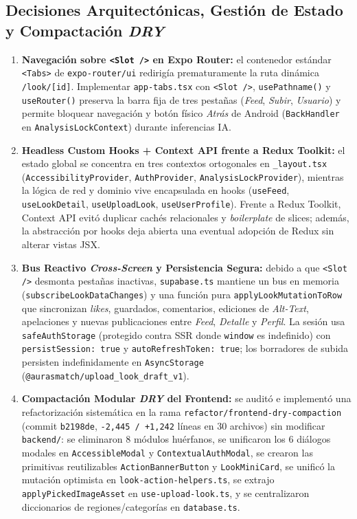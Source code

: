 \documentclass[conference]{IEEEtran}
\begin{document}
\subsection{Decisiones Arquitectónicas, Gestión de Estado y Compactación \textit{DRY}}
\begin{enumerate}
    \item \textbf{Navegación sobre \texttt{<Slot />} en Expo Router:} el contenedor estándar \texttt{<Tabs>} de \texttt{expo-router/ui} redirigía prematuramente la ruta dinámica \texttt{/look/[id]}. Implementar \texttt{app-tabs.tsx} con \texttt{<Slot />}, \texttt{usePathname()} y \texttt{useRouter()} preserva la barra fija de tres pestañas (\textit{Feed}, \textit{Subir}, \textit{Usuario}) y permite bloquear navegación y botón físico \textit{Atrás} de Android (\texttt{BackHandler} en \texttt{AnalysisLockContext}) durante inferencias IA.
    \item \textbf{Headless Custom Hooks + Context API frente a Redux Toolkit:} el estado global se concentra en tres contextos ortogonales en \texttt{\_layout.tsx} (\texttt{AccessibilityProvider}, \texttt{AuthProvider}, \texttt{AnalysisLockProvider}), mientras la lógica de red y dominio vive encapsulada en hooks (\texttt{useFeed}, \texttt{useLookDetail}, \texttt{useUploadLook}, \texttt{useUserProfile}). Frente a Redux Toolkit, Context API evitó duplicar cachés relacionales y \textit{boilerplate} de slices; además, la abstracción por hooks deja abierta una eventual adopción de Redux sin alterar vistas JSX.
    \item \textbf{Bus Reactivo \textit{Cross-Screen} y Persistencia Segura:} debido a que \texttt{<Slot />} desmonta pestañas inactivas, \texttt{supabase.ts} mantiene un bus en memoria (\texttt{subscribeLookDataChanges}) y una función pura \texttt{applyLookMutationToRow} que sincronizan \textit{likes}, guardados, comentarios, ediciones de \textit{Alt-Text}, apelaciones y nuevas publicaciones entre \textit{Feed}, \textit{Detalle} y \textit{Perfil}. La sesión usa \texttt{safeAuthStorage} (protegido contra SSR donde \texttt{window} es indefinido) con \texttt{persistSession: true} y \texttt{autoRefreshToken: true}; los borradores de subida persisten indefinidamente en \texttt{AsyncStorage} (\texttt{@aurasmatch/upload\_look\_draft\_v1}).
    \item \textbf{Compactación Modular \textit{DRY} del Frontend:} se auditó e implementó una refactorización sistemática en la rama \texttt{refactor/frontend-dry-compaction} (commit \texttt{b2198de}, \texttt{-2,445 / +1,242} líneas en 30 archivos) sin modificar \texttt{backend/}: se eliminaron 8 módulos huérfanos, se unificaron los 6 diálogos modales en \texttt{AccessibleModal} y \texttt{ContextualAuthModal}, se crearon las primitivas reutilizables \texttt{ActionBannerButton} y \texttt{LookMiniCard}, se unificó la mutación optimista en \texttt{look-action-helpers.ts}, se extrajo \texttt{applyPickedImageAsset} en \texttt{use-upload-look.ts}, y se centralizaron diccionarios de regiones/categorías en \texttt{database.ts}.

\end{enumerate}
\end{document}

